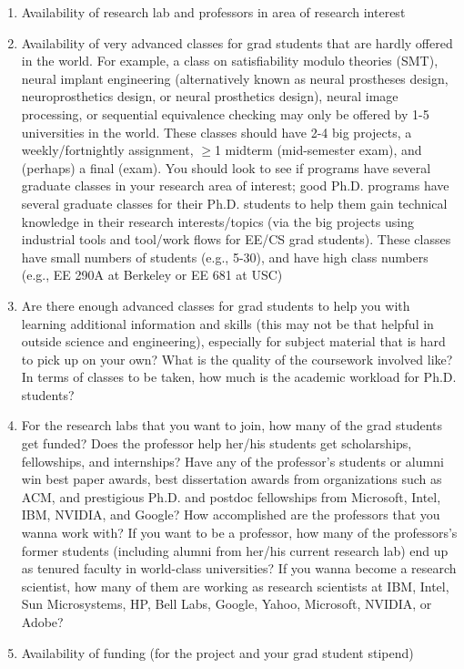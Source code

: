 \begin{enumerate}
\begin{enumerate}
	\item Availability of research lab and professors in area of research interest
	\item Availability of very advanced classes for grad students that are hardly offered in the world. For example, a class on satisfiability modulo theories (SMT), neural implant engineering (alternatively known as neural prostheses design, neuroprosthetics design, or neural prosthetics design), neural image processing, or sequential equivalence checking may only be offered by 1-5 universities in the world. These classes should have 2-4 big projects, a weekly/fortnightly assignment, $\geq$1 midterm (mid-semester exam), and (perhaps) a final (exam). You should look to see if programs have several graduate classes in your research area of interest; good Ph.D. programs have several graduate classes for their Ph.D. students to help them gain technical knowledge in their research interests/topics (via the big projects using industrial tools and tool/work flows for EE/CS grad students). These classes have small numbers of students (e.g., 5-30), and have high class numbers (e.g., EE 290A at Berkeley or EE 681 at USC)
	\item Are there enough advanced classes for grad students to help you with learning additional information and skills (this may not be that helpful in outside science and engineering), especially for subject material that is hard to pick up on your own? What is the quality of the coursework involved like? In terms of classes to be taken, how much is the academic workload for Ph.D. students?	
	\item For the research labs that you want to join, how many of the grad students get funded? Does the professor help her/his students get scholarships, fellowships, and internships? Have any of the professor's students or alumni win best paper awards, best dissertation awards from organizations such as ACM, and prestigious Ph.D. and postdoc fellowships from Microsoft, Intel, IBM, NVIDIA, and Google? How accomplished are the professors that you wanna work with? If you want to be a professor, how many of the professors's former students (including alumni from her/his current research lab) end up as tenured faculty in world-class universities? If you wanna become a research scientist, how many of them are working as research scientists at IBM, Intel, Sun Microsystems, HP, Bell Labs, Google, Yahoo, Microsoft, NVIDIA, or Adobe?
	\item Availability of funding (for the project and your grad student stipend)

\end{enumerate}
\end{enumerate}
